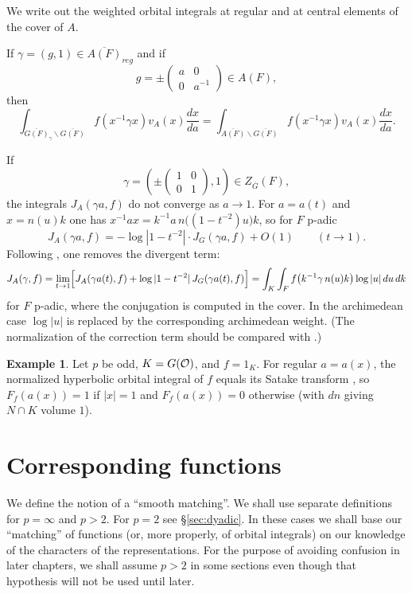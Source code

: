 \documentclass[12pt,letterpaper,openany]{book}
\theoremstyle{plain}
\theoremstyle{definition}
\newtheorem{example}[theorem]{Example}
\theoremstyle{remark}
\theoremstyle{remark}
\begin{document}
We write out the weighted orbital integrals at regular and at central elements of the cover of $A$.


If $\gamma =(g,1)\in \overline{A(F)}_{reg}$ and if
\[
g=
\pm \left(
\begin{array}{cc}
a & 0\\
0 & a^{-1}
\end{array}
\right)
\in A(F),
\]
then
\begin{equation}
\int_{\overline{G(F)}_\gamma\backslash \overline{G(F)}}
f(x^{-1}\gamma x)v_A(x)\frac{dx}{da}
=\int_{\overline{A(F)}\backslash \overline{G(F)}}
f(x^{-1}\gamma x)v_A(x)\frac{dx}{da}.
\end{equation}

If
\[
\gamma=
(
\pm \left(
\begin{array}{cc}
1 & 0\\
0 & 1
\end{array}
\right)
,1)\in Z_{\overline{G}}(F),
\]
the integrals $J_A(\gamma a,f)$ do not converge as $a\rightarrow1$. For
$a=a(t)$ and $x=n(u)k$ one has
$x^{-1}ax=k^{-1}a\,n\bigl((1-t^{-2})u\bigr)k$, so for $F$ p-adic
\[
J_A(\gamma a,f)=-\log|1-t^{-2}|\cdot J_G(\gamma a,f)+O(1)
\qquad(t\rightarrow1).
\]
Following \cite[(8.1)]{A7}, one removes the divergent term:
\begin{equation}
J_A(\gamma,f)=
\lim_{t\rightarrow 1}
\Bigl[J_A(\gamma a(t),f)+\log|1-t^{-2}|\,J_G(\gamma a(t),f)\Bigr]
=\int_K\int_F f\bigl(k^{-1}\gamma\,n(u)k\bigr)\log|u|\,du\,dk
\end{equation}
for $F$ p-adic, where the conjugation is computed in the cover. In the
archimedean case $\log|u|$ is replaced by the corresponding archimedean
weight. (The normalization of the correction term should be compared with
\cite{A7}.)

\begin{example}
Let $p$ be odd, $K=G({\cal O})$, and $f=1_K$. For regular $a=a(x)$, the
normalized hyperbolic orbital integral of $f$ equals its Satake transform
\cite{C}, so $F_f(a(x))=1$ if $|x|=1$ and $F_f(a(x))=0$ otherwise (with
$dn$ giving $N\cap K$ volume $1$).
\end{example}

\section{Corresponding functions}

We define the notion of a ``smooth matching''. We shall use separate
definitions for $p=\infty$ and $p>2$. For $p=2$ see
\S\ref{sec:dyadic}.
In these cases we shall base our ``matching'' of functions (or, more
properly, of orbital integrals) on our knowledge of the characters of the
representations. For the purpose of avoiding confusion in later
chapters, we shall assume $p>2$ in some sections even though
that hypothesis will not be used until later.
\end{document}
